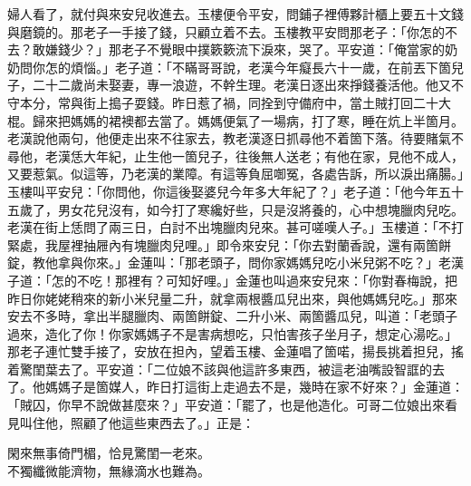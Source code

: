 婦人看了，就付與來安兒收進去。玉樓便令平安，問鋪子裡傅夥計櫃上要五十文錢與磨鏡的。那老子一手接了錢，只顧立着不去。玉樓教平安問那老子：「你怎的不去？敢嫌錢少？」那老子不覺眼中撲簌簌流下淚來，哭了。平安道：「俺當家的奶奶問你怎的煩惱。」老子道：「不瞞哥哥說，老漢今年癡長六十一歲，在前丟下箇兒子，二十二歲尚未娶妻，專一浪遊，不幹生理。老漢日逐出來掙錢養活他。他又不守本分，常與街上搗子耍錢。昨日惹了禍，同拴到守備府中，當土賊打回二十大棍。歸來把媽媽的裙襖都去當了。媽媽便氣了一場病，打了寒，睡在炕上半箇月。老漢說他兩句，他便走出來不往家去，教老漢逐日抓尋他不着箇下落。待要賭氣不尋他，老漢恁大年紀，止生他一箇兒子，往後無人送老；有他在家，見他不成人，又要惹氣。似這等，乃老漢的業障。有這等負屈啣冤，各處告訴，所以淚出痛腸。」玉樓叫平安兒：「你問他，你這後娶婆兒今年多大年紀了？」老子道：「他今年五十五歲了，男女花兒沒有，如今打了寒纔好些，只是沒將養的，心中想塊臘肉兒吃。老漢在街上恁問了兩三日，白討不出塊臘肉兒來。甚可嗟嘆人子。」玉樓道：「不打緊處，我屋裡抽屜內有塊臘肉兒哩。」即令來安兒：「你去對蘭香說，還有兩箇餅錠，教他拿與你來。」金蓮叫：「那老頭子，問你家媽媽兒吃小米兒粥不吃？」老漢子道：「怎的不吃！那裡有？可知好哩。」金蓮也叫過來安兒來：「你對春梅說，把昨日你姥姥稍來的新小米兒量二升，就拿兩根醬瓜兒出來，與他媽媽兒吃。」那來安去不多時，拿出半腿臘肉、兩箇餅錠、二升小米、兩箇醬瓜兒，叫道：「老頭子過來，造化了你！你家媽媽子不是害病想吃，只怕害孩子坐月子，想定心湯吃。」那老子連忙雙手接了，安放在担內，望着玉樓、金蓮唱了箇喏，揚長挑着担兒，搖着驚閨葉去了。平安道：「二位娘不該與他這許多東西，被這老油嘴設智誆的去了。他媽媽子是箇媒人，昨日打這街上走過去不是，幾時在家不好來？」金蓮道：「賊囚，你早不說做甚麼來？」平安道：「罷了，也是他造化。可哥二位娘出來看見叫住他，照顧了他這些東西去了。」正是：

\begin{myquote} 
閑來無事倚門楣，恰見驚閨一老來。\\不獨纖微能濟物，無緣滴水也難為。
\end{myquote} 

